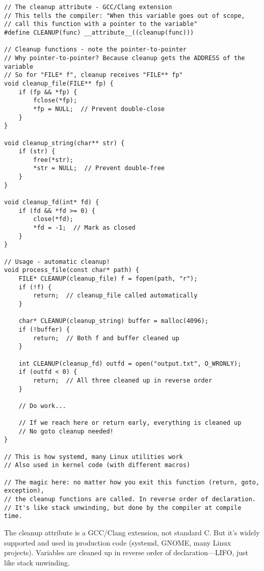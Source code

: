 \begin{lstlisting}
// The cleanup attribute - GCC/Clang extension
// This tells the compiler: "When this variable goes out of scope,
// call this function with a pointer to the variable"
#define CLEANUP(func) __attribute__((cleanup(func)))

// Cleanup functions - note the pointer-to-pointer
// Why pointer-to-pointer? Because cleanup gets the ADDRESS of the variable
// So for "FILE* f", cleanup receives "FILE** fp"
void cleanup_file(FILE** fp) {
    if (fp && *fp) {
        fclose(*fp);
        *fp = NULL;  // Prevent double-close
    }
}

void cleanup_string(char** str) {
    if (str) {
        free(*str);
        *str = NULL;  // Prevent double-free
    }
}

void cleanup_fd(int* fd) {
    if (fd && *fd >= 0) {
        close(*fd);
        *fd = -1;  // Mark as closed
    }
}

// Usage - automatic cleanup!
void process_file(const char* path) {
    FILE* CLEANUP(cleanup_file) f = fopen(path, "r");
    if (!f) {
        return;  // cleanup_file called automatically
    }

    char* CLEANUP(cleanup_string) buffer = malloc(4096);
    if (!buffer) {
        return;  // Both f and buffer cleaned up
    }

    int CLEANUP(cleanup_fd) outfd = open("output.txt", O_WRONLY);
    if (outfd < 0) {
        return;  // All three cleaned up in reverse order
    }

    // Do work...

    // If we reach here or return early, everything is cleaned up
    // No goto cleanup needed!
}

// This is how systemd, many Linux utilities work
// Also used in kernel code (with different macros)

// The magic here: no matter how you exit this function (return, goto, exception),
// the cleanup functions are called. In reverse order of declaration.
// It's like stack unwinding, but done by the compiler at compile time.
\end{lstlisting}

\begin{notebox}
The cleanup attribute is a GCC/Clang extension, not standard C. But it's widely supported and used in production code (systemd, GNOME, many Linux projects). Variables are cleaned up in reverse order of declaration—LIFO, just like stack unwinding.
\end{notebox}

